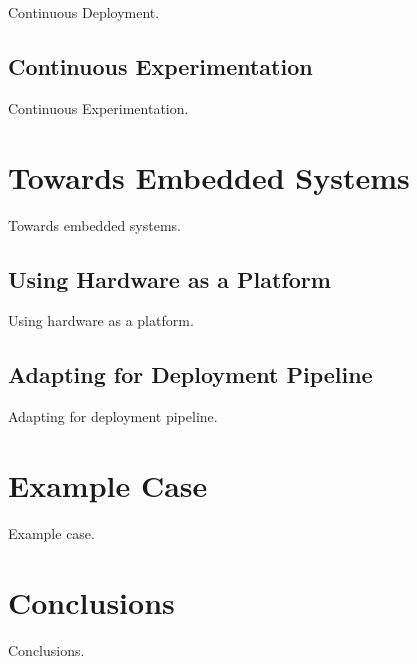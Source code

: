 \documentclass[english]{tktltiki2}
\begin{document}
Continuous Deployment.

\subsection{Continuous Experimentation}

Continuous Experimentation.


\section{Towards Embedded Systems}

Towards embedded systems.

\subsection{Using Hardware as a Platform}

Using hardware as a platform.

\subsection{Adapting for Deployment Pipeline}

Adapting for deployment pipeline.


\section{Example Case}

Example case.


\section{Conclusions}

Conclusions.




\end{document}
